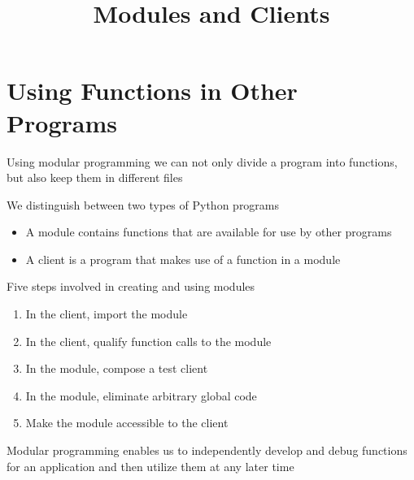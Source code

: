 \documentclass[8pt,a4paper,compress]{beamer}
\title{Modules and Clients}
\date{}
\begin{document}
\begin{frame}
\vfill
\titlepage
\end{frame}

\section{Using Functions in Other Programs}
\begin{frame}[fragile]
\pause

Using modular programming we can not only divide a program into functions, but also keep them in different files

\pause
\bigskip

We distinguish between two types of Python programs
\begin{itemize}
\pause
\item A module contains functions that are available for use by other programs

\pause
\item A client is a program that makes use of a function in a module
\end{itemize}

\pause
\bigskip

Five steps involved in creating and using modules
\begin{enumerate}
\pause
\item In the client, import the module

\pause
\item In the client, qualify function calls to the module

\pause
\item In the module, compose a test client

\pause
\item In the module, eliminate arbitrary global code

\pause
\item Make the module accessible to the client
\end{enumerate}

\pause
\bigskip

Modular programming enables us to independently develop and debug functions for an application and then utilize them at any later time
\end{frame}
\end{document}
